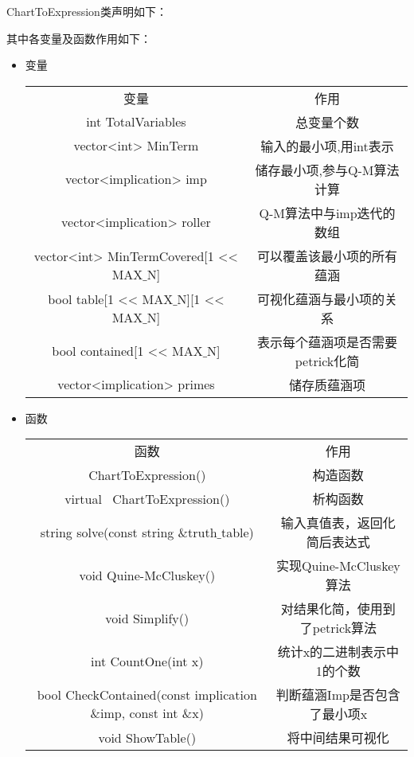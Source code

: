 ChartToExpression类声明如下：


其中各变量及函数作用如下：

\begin{itemize}
	\item{变量}
	\begin{center}
		\begin{tabular}{cc}
			变量 & 作用 \\
			int TotalVariables & 总变量个数 \\
			vector<int> MinTerm & 输入的最小项,用int表示\\
			vector<implication> imp & 储存最小项,参与Q-M算法计算\\
			vector<implication> roller & Q-M算法中与imp迭代的数组\\
			vector<int> MinTermCovered[1 << MAX$\_$N] &
			可以覆盖该最小项的所有蕴涵\\
			bool table[1 << MAX$\_$N][1 << MAX$\_$N] &
			可视化蕴涵与最小项的关系\\
			bool contained[1 << MAX$\_$N] & 
			表示每个蕴涵项是否需要petrick化简\\
			vector<implication> primes &
			储存质蕴涵项\\

		\end{tabular}
	\end{center}
	\item{函数}
	\begin{center}
		\begin{tabular}{cc}
			函数 & 作用 \\
			ChartToExpression() & 构造函数\\
			virtual ~ChartToExpression() & 析构函数\\
			string solve(const string $\&$truth$\_$table) &
			输入真值表，返回化简后表达式\\
			void Quine-McCluskey() & 实现Quine-McCluskey算法\\
			void Simplify() & 对结果化简，使用到了petrick算法\\
			int CountOne(int x) & 统计x的二进制表示中1的个数\\
			bool CheckContained(const implication $\&$imp, const int $\&$x) &
			判断蕴涵Imp是否包含了最小项x\\
			void ShowTable() & 将中间结果可视化\\
		\end{tabular}
	\end{center}
\end{itemize}

